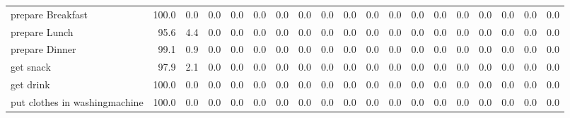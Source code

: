 \documentclass{article}
\begin{document}
\begin{sideways}
\begin{tabular}{lrrrrrrrrrrrrrrrrrr}
prepare Breakfast             &       100.0 &                0.0 &           0.0 &                          0.0 &                0.0 &                0.0 &                        0.0 &          0.0 &              0.0 &                0.0 &                    0.0 &                      0.0 &                  0.0 &                   0.0 &              0.0 &              0.0 &                                  0.0 &          0.0 \\
prepare Lunch                 &        95.6 &                4.4 &           0.0 &                          0.0 &                0.0 &                0.0 &                        0.0 &          0.0 &              0.0 &                0.0 &                    0.0 &                      0.0 &                  0.0 &                   0.0 &              0.0 &              0.0 &                                  0.0 &          0.0 \\
prepare Dinner                &        99.1 &                0.9 &           0.0 &                          0.0 &                0.0 &                0.0 &                        0.0 &          0.0 &              0.0 &                0.0 &                    0.0 &                      0.0 &                  0.0 &                   0.0 &              0.0 &              0.0 &                                  0.0 &          0.0 \\
get snack                     &        97.9 &                2.1 &           0.0 &                          0.0 &                0.0 &                0.0 &                        0.0 &          0.0 &              0.0 &                0.0 &                    0.0 &                      0.0 &                  0.0 &                   0.0 &              0.0 &              0.0 &                                  0.0 &          0.0 \\
get drink                     &       100.0 &                0.0 &           0.0 &                          0.0 &                0.0 &                0.0 &                        0.0 &          0.0 &              0.0 &                0.0 &                    0.0 &                      0.0 &                  0.0 &                   0.0 &              0.0 &              0.0 &                                  0.0 &          0.0 \\
put clothes in washingmachine &       100.0 &                0.0 &           0.0 &                          0.0 &                0.0 &                0.0 &                        0.0 &          0.0 &              0.0 &                0.0 &                    0.0 &                      0.0 &                  0.0 &                   0.0 &              0.0 &              0.0 &                                  0.0 &          0.0 \\

\end{tabular}
\end{sideways}
\end{document}
